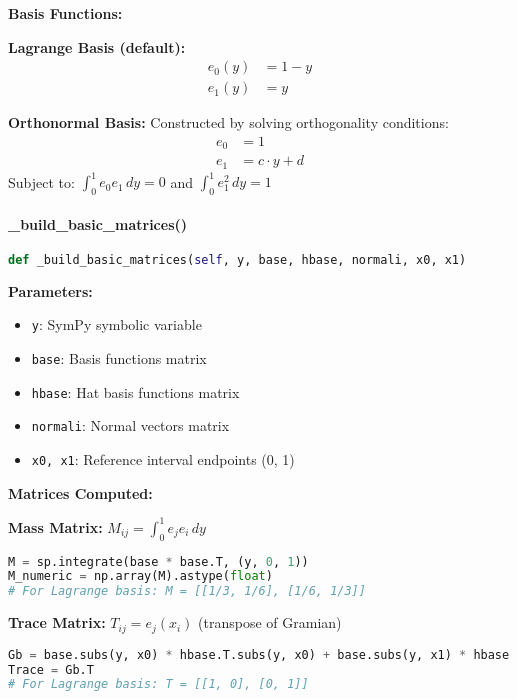 \textbf{Basis Functions:}

\textbf{Lagrange Basis (default):}
\begin{align}
e_0(y) &= 1 - y \\
e_1(y) &= y
\end{align}

\textbf{Orthonormal Basis:} Constructed by solving orthogonality conditions:
\begin{align}
e_0 &= 1 \\
e_1 &= c \cdot y + d
\end{align}
Subject to: $\int_0^1 e_0 e_1 \, dy = 0$ and $\int_0^1 e_1^2 \, dy = 1$

\paragraph{\_build\_basic\_matrices()}\leavevmode
\begin{lstlisting}[language=Python, caption=Build Basic Matrices Method]
def _build_basic_matrices(self, y, base, hbase, normali, x0, x1)
\end{lstlisting}

\textbf{Parameters:}
\begin{itemize}
    \item \texttt{y}: SymPy symbolic variable
    \item \texttt{base}: Basis functions matrix
    \item \texttt{hbase}: Hat basis functions matrix
    \item \texttt{normali}: Normal vectors matrix
    \item \texttt{x0, x1}: Reference interval endpoints (0, 1)
\end{itemize}

\textbf{Matrices Computed:}

\textbf{Mass Matrix:} $M_{ij} = \int_0^1 e_j e_i \, dy$
\begin{lstlisting}[language=Python, caption=Mass Matrix Computation]
M = sp.integrate(base * base.T, (y, 0, 1))
M_numeric = np.array(M).astype(float)
# For Lagrange basis: M = [[1/3, 1/6], [1/6, 1/3]]
\end{lstlisting}

\textbf{Trace Matrix:} $T_{ij} = e_j(x_i)$ (transpose of Gramian)
\begin{lstlisting}[language=Python, caption=Trace Matrix Computation]
Gb = base.subs(y, x0) * hbase.T.subs(y, x0) + base.subs(y, x1) * hbase.T.subs(y, x1)
Trace = Gb.T
# For Lagrange basis: T = [[1, 0], [0, 1]]
\end{lstlisting}


